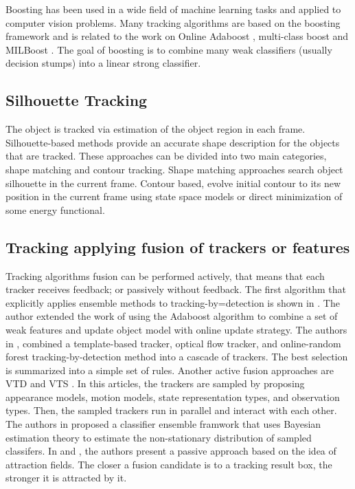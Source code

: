 \begin{itemize}
	Boosting has been used in a wide field of machine learning tasks and applied to computer vision problems. Many tracking algorithms are based on the boosting framework \cite{Freund1997a} and is related to the work on Online Adaboost \cite{Avidan2007,Grabner2008,Oza2000}, multi-class boost \cite{Saffari2010} and MILBoost \cite{Babenko2010}. The goal of boosting is to combine many weak classifiers (usually decision stumps) into a linear strong classifier.

\end{itemize}


\subsection{Silhouette Tracking}

The object is tracked via estimation of the object region in each frame. Silhouette-based methods provide an accurate shape description for the objects that are tracked. These approaches can be divided into two main categories, shape matching and contour tracking. Shape matching approaches search object silhouette in the current frame. Contour based, evolve initial contour to its new position in the current frame using state space models or direct minimization of some energy functional.

\subsection{Tracking applying fusion of trackers or features}

Tracking algorithms fusion can be performed actively, that means that each tracker receives feedback; or passively without feedback. The first algorithm that explicitly applies ensemble methods to tracking-by=detection is shown in \cite{Avidan2007}. The author extended the work of \cite{Collins2005} using the Adaboost algorithm to combine a set of weak features and update object model with online update strategy. The authors in \cite{Santner2010}, combined a template-based tracker, optical flow tracker, and online-random forest tracking-by-detection method into a cascade of trackers. The best selection is summarized into a simple set of rules. Another active fusion approaches are VTD \cite{Kwon2010} and VTS \cite{Kwon2011}. In this articles, the trackers are sampled by proposing appearance models, motion models, state representation types, and observation types. Then, the sampled trackers run in parallel and interact with each other. The authors in \cite{Bai2013} proposed a classifier ensemble framwork that uses Bayesian estimation theory to estimate the non-stationary distribution of sampled classifers. In \cite{Bailer2013} and \cite{Bailer2014}, the authors present a passive approach based on the idea of attraction fields. The closer a fusion candidate is to a tracking result box, the stronger it is attracted by it.
